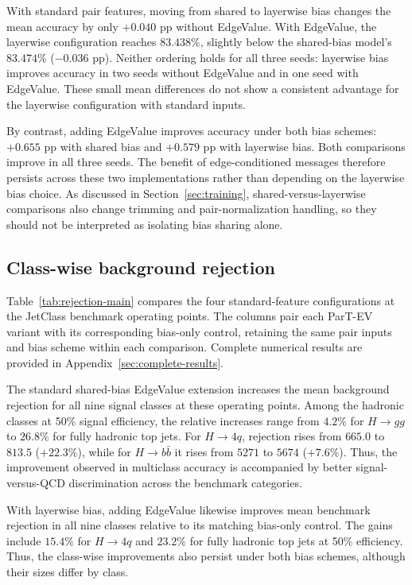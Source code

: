 

With standard pair features, moving from shared to layerwise bias changes the
mean accuracy by only $+0.040$ pp without EdgeValue. With EdgeValue, the
layerwise configuration reaches $83.438\%$, slightly below the shared-bias
model's $83.474\%$ ($-0.036$ pp). Neither ordering holds for all three seeds:
layerwise bias improves accuracy in two seeds without EdgeValue and in one
seed with EdgeValue. These small mean differences do not show a consistent
advantage for the layerwise configuration with standard inputs.

By contrast, adding EdgeValue improves accuracy under both bias schemes:
$+0.655$ pp with shared bias and $+0.579$ pp with layerwise bias. Both
comparisons improve in all three seeds. The benefit of edge-conditioned
messages therefore persists across these two implementations rather than
depending on the layerwise bias choice. As discussed in
Section~\ref{sec:training}, shared-versus-layerwise comparisons also change
trimming and pair-normalization handling, so they should not be interpreted
as isolating bias sharing alone.

\subsection{Class-wise background rejection}
\label{sec:results-rejection}

Table~\ref{tab:rejection-main} compares the four standard-feature
configurations at the JetClass benchmark operating points. The columns
pair each ParT-EV variant with its corresponding bias-only control,
retaining the same pair inputs and bias scheme within each comparison.
Complete numerical results are provided in
Appendix~\ref{sec:complete-results}.



The standard shared-bias EdgeValue extension increases the mean background
rejection for all nine signal classes at these operating points. Among the
hadronic classes at 50\% signal efficiency, the relative increases range
from $4.2\%$ for $H\to gg$ to $26.8\%$ for fully hadronic top jets.
For $H\to4q$, rejection rises from $665.0$ to $813.5$ ($+22.3\%$),
while for $H\to b\bar b$ it rises from $5271$ to $5674$ ($+7.6\%$).
Thus, the improvement observed in multiclass accuracy is accompanied by
better signal-versus-QCD discrimination across the benchmark categories.

With layerwise bias, adding EdgeValue likewise improves mean benchmark
rejection in all nine classes relative to its matching bias-only control.
The gains include $15.4\%$ for $H\to4q$ and $23.2\%$ for fully
hadronic top jets at 50\% efficiency. Thus, the class-wise improvements
also persist under both bias schemes, although their sizes differ by class.

